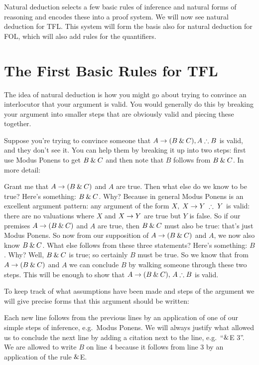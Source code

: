 Natural deduction selects a few basic rules of inference and natural forms of reasoning and encodes these into a proof system. We will now see natural deduction for TFL. This system will form the basis also for natural deduction for FOL, which will also add rules for the quantifiers. 

\chapter{The First Basic Rules for TFL}\label{s:BasicTFL}
The idea of natural deduction is how you might go about trying to convince an interlocutor that your argument is valid. You would generally do this by breaking your argument into smaller steps that are obviously valid and piecing these together. 

Suppose you're trying to convince someone that $A\eif(B\eand C),A\therefore B$ is valid, and they don't see it. You can help them by breaking it up into two steps: first use Modus Ponens to get $B\mathbin{\&} C$ and then note that $B$ follows from $B\mathbin{\&} C$. In more detail: 

Grant me that $A\rightarrow (B\mathbin{\&} C)$ and $A$ are true. Then what else do we know to be true? Here's something: $B\mathbin{\&} C$. Why? Because in general Modus Ponens is an excellent argument pattern: any argument of the form $X,\;X\eif Y\;\therefore\;Y$ is valid: there are no valuations where $X$ and $X\rightarrow Y$ are true but $Y$ is false. So if our premises  $A\rightarrow (B\mathbin{\&} C)$ and $A$ are true, then $B\mathbin{\&} C$ must also be true: that's just Modus Ponens. So now from our supposition of $A\rightarrow(B\mathbin{\&} C)$ and $A$, we now also know $B\mathbin{\&} C$. What else follows from these three statements? Here's something: $B$. Why? Well, $B\mathbin{\&} C$ is true; so certainly $B$ must be true. So we know that from $A\rightarrow(B\mathbin{\&} C)$ and $A$ we can conclude $B$ by walking someone through these two steps. This will be enough to show that $A\eif(B\eand C),\,A\therefore B$ is valid. 

To keep track of what assumptions have been made and steps of the argument we will give precise forms that this argument should be written:
\begin{pf}
\end{pf}

Each new line follows from the previous lines by an application of one of our simple steps of inference, e.g.~Modus Ponens. We will always justify what allowed us to conclude the next line by adding a citation next to the line, e.g.~``$\mathbin{\&}$E 3''. We are allowed to write $B$ on line 4 because it follows from line 3 by an application of the rule $\mathbin{\&}$E.

